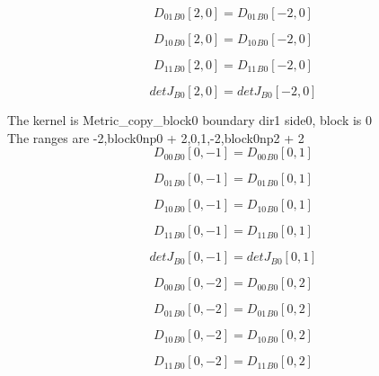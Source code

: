 \documentclass{article}
\begin{document}
\begin{dmath}{D_{01}{_{B0}}}[{2,0}] = {D_{01}{_{B0}}}[{-2,0}]\end{dmath}

\begin{dmath}{D_{10}{_{B0}}}[{2,0}] = {D_{10}{_{B0}}}[{-2,0}]\end{dmath}

\begin{dmath}{D_{11}{_{B0}}}[{2,0}] = {D_{11}{_{B0}}}[{-2,0}]\end{dmath}

\begin{dmath}{detJ{_{B0}}}[{2,0}] = {detJ{_{B0}}}[{-2,0}]\end{dmath}

\noindent The kernel is Metric_copy_block0 boundary dir1 side0, block is 0\\\noindent The ranges are -2,block0np0 + 2,0,1,-2,block0np2 + 2\\\begin{dmath}{D_{00}{_{B0}}}[{0,-1}] = {D_{00}{_{B0}}}[{0,1}]\end{dmath}

\begin{dmath}{D_{01}{_{B0}}}[{0,-1}] = {D_{01}{_{B0}}}[{0,1}]\end{dmath}

\begin{dmath}{D_{10}{_{B0}}}[{0,-1}] = {D_{10}{_{B0}}}[{0,1}]\end{dmath}

\begin{dmath}{D_{11}{_{B0}}}[{0,-1}] = {D_{11}{_{B0}}}[{0,1}]\end{dmath}

\begin{dmath}{detJ{_{B0}}}[{0,-1}] = {detJ{_{B0}}}[{0,1}]\end{dmath}

\begin{dmath}{D_{00}{_{B0}}}[{0,-2}] = {D_{00}{_{B0}}}[{0,2}]\end{dmath}

\begin{dmath}{D_{01}{_{B0}}}[{0,-2}] = {D_{01}{_{B0}}}[{0,2}]\end{dmath}

\begin{dmath}{D_{10}{_{B0}}}[{0,-2}] = {D_{10}{_{B0}}}[{0,2}]\end{dmath}

\begin{dmath}{D_{11}{_{B0}}}[{0,-2}] = {D_{11}{_{B0}}}[{0,2}]\end{dmath}
\end{document}
